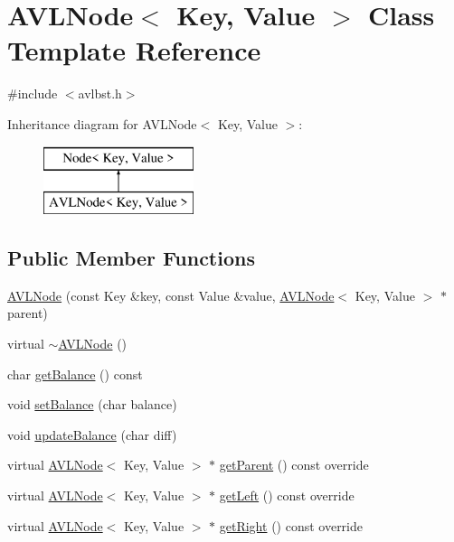 \hypertarget{classAVLNode}{\section{A\-V\-L\-Node$<$ Key, Value $>$ Class Template Reference}
\label{classAVLNode}
}


{\ttfamily \#include $<$avlbst.\-h$>$}

Inheritance diagram for A\-V\-L\-Node$<$ Key, Value $>$\-:\begin{figure}[H]
\begin{center}
\leavevmode
\includegraphics[height=2.000000cm]{classAVLNode}
\end{center}
\end{figure}
\subsection*{Public Member Functions}
\begin{DoxyCompactItemize}
\item 
\hyperlink{classAVLNode_a0c590cfe936353fe4d6eca380747d2d7}{A\-V\-L\-Node} (const Key \&key, const Value \&value, \hyperlink{classAVLNode}{A\-V\-L\-Node}$<$ Key, Value $>$ $\ast$parent)
\item 
virtual \hyperlink{classAVLNode_aaa13278d912e6dbd1147973213b61ec2}{$\sim$\-A\-V\-L\-Node} ()
\item 
char \hyperlink{classAVLNode_a98998d2f9be815c9775dddd0cf950a9a}{get\-Balance} () const 
\item 
void \hyperlink{classAVLNode_a5edf25a95b444da26b20ad1546ac31a9}{set\-Balance} (char balance)
\item 
void \hyperlink{classAVLNode_aa2bc7512704adb240d8e1c18c1c15853}{update\-Balance} (char diff)
\item 
virtual \hyperlink{classAVLNode}{A\-V\-L\-Node}$<$ Key, Value $>$ $\ast$ \hyperlink{classAVLNode_a192664222857753573eba15c6e9b6205}{get\-Parent} () const override
\item 
virtual \hyperlink{classAVLNode}{A\-V\-L\-Node}$<$ Key, Value $>$ $\ast$ \hyperlink{classAVLNode_af681acf83cebd11fb1083262b8100c70}{get\-Left} () const override
\item 
virtual \hyperlink{classAVLNode}{A\-V\-L\-Node}$<$ Key, Value $>$ $\ast$ \hyperlink{classAVLNode_ac57cebda2c1b448d22e00dcb9248cfb8}{get\-Right} () const override
\end{DoxyCompactItemize}
